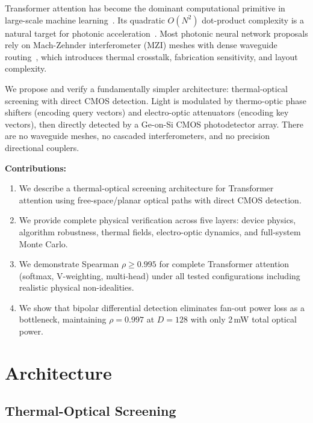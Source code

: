 \documentclass[conference]{IEEEtran}
\begin{document}
Transformer attention has become the dominant computational primitive
in large-scale machine learning~\cite{vaswani2017attention}. Its
quadratic $O(N^2)$ dot-product complexity is a natural target for
photonic acceleration~\cite{shen2017deep,miller2013self}. Most
photonic neural network proposals rely on Mach-Zehnder interferometer
(MZI) meshes with dense waveguide routing~\cite{clements2016optimal},
which introduces thermal crosstalk, fabrication sensitivity, and
layout complexity.

We propose and verify a fundamentally simpler architecture: thermal-optical
screening with direct CMOS detection. Light is modulated by thermo-optic
phase shifters (encoding query vectors) and electro-optic attenuators
(encoding key vectors), then directly detected by a Ge-on-Si CMOS
photodetector array. There are no waveguide meshes, no cascaded
interferometers, and no precision directional couplers.

\textbf{Contributions:}
\begin{enumerate}
    \item We describe a thermal-optical screening architecture for
          Transformer attention using free-space/planar optical paths
          with direct CMOS detection.
    \item We provide complete physical verification across five layers:
          device physics, algorithm robustness, thermal fields,
          electro-optic dynamics, and full-system Monte Carlo.
    \item We demonstrate Spearman $\rho\ge0.995$ for complete Transformer
          attention (softmax, V-weighting, multi-head) under all tested
          configurations including realistic physical non-idealities.
    \item We show that bipolar differential detection eliminates
          fan-out power loss as a bottleneck, maintaining $\rho=0.997$
          at $D=128$ with only 2\,mW total optical power.
\end{enumerate}

\section{Architecture}

\subsection{Thermal-Optical Screening}
\end{document}
